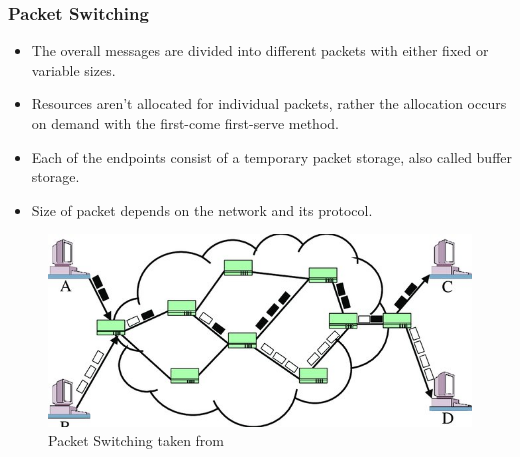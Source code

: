 \documentclass{home_assignment}
\begin{document}
\subsubsection*{Packet Switching}
\begin{itemize}
\item The overall messages are divided into different packets with either fixed or variable sizes.
\item Resources aren't allocated for individual packets, rather the allocation occurs on demand with the first-come first-serve method.
\item Each of the endpoints consist of a temporary packet storage, also called buffer storage.
\item Size of packet depends on the network and its protocol.
\end{itemize}
\begin{figure}[H]
\centering
\includegraphics[scale=1.5]{./Figures/pktswitching.jpg}
\caption{Packet Switching taken from \cite{pktswitching}}
\label{fig:pktswitching}
\end{figure}
\end{document}
